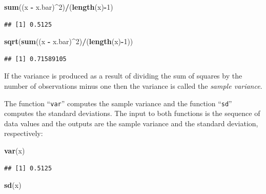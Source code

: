 \documentclass[]{krantz}
\makeatletter
\newenvironment{Shaded}{\begin{snugshade}}{\end{snugshade}}
\newcommand{\KeywordTok}[1]{\textcolor[rgb]{0.13,0.29,0.53}{\textbf{#1}}}
\newcommand{\DecValTok}[1]{\textcolor[rgb]{0.00,0.00,0.81}{#1}}
\newcommand{\StringTok}[1]{\textcolor[rgb]{0.31,0.60,0.02}{#1}}
\newcommand{\OperatorTok}[1]{\textcolor[rgb]{0.81,0.36,0.00}{\textbf{#1}}}
\newcommand{\NormalTok}[1]{#1}
\newenvironment{kframe}{%
\medskip{}
\setlength{\fboxsep}{.8em}
 \def\at@end@of@kframe{}%
 \ifinner\ifhmode%
  \def\at@end@of@kframe{\end{minipage}}%
  \begin{minipage}{\columnwidth}%
 \fi\fi%
 \def\FrameCommand##1{\hskip\@totalleftmargin \hskip-\fboxsep
 \colorbox{shadecolor}{##1}\hskip-\fboxsep
     \hskip-\linewidth \hskip-\@totalleftmargin \hskip\columnwidth}%
 \MakeFramed {\advance\hsize-\width
   \@totalleftmargin\z@ \linewidth\hsize
   \@setminipage}}%
 {\par\unskip\endMakeFramed%
 \at@end@of@kframe}
\renewenvironment{Shaded}{\begin{kframe}}{\end{kframe}}
\theoremstyle{definition}
\theoremstyle{definition}
\theoremstyle{definition}
\theoremstyle{remark}
\makeatother
\begin{document}
\begin{Shaded}
\begin{Highlighting}[]
\KeywordTok{sum}\NormalTok{((x }\OperatorTok{-}\StringTok{ }\NormalTok{x.bar)}\OperatorTok{^}\DecValTok{2}\NormalTok{)}\OperatorTok{/}\NormalTok{(}\KeywordTok{length}\NormalTok{(x)}\OperatorTok{-}\DecValTok{1}\NormalTok{)}
\end{Highlighting}
\end{Shaded}

\begin{verbatim}
## [1] 0.5125
\end{verbatim}

\begin{Shaded}
\begin{Highlighting}[]
\KeywordTok{sqrt}\NormalTok{(}\KeywordTok{sum}\NormalTok{((x }\OperatorTok{-}\StringTok{ }\NormalTok{x.bar)}\OperatorTok{^}\DecValTok{2}\NormalTok{)}\OperatorTok{/}\NormalTok{(}\KeywordTok{length}\NormalTok{(x)}\OperatorTok{-}\DecValTok{1}\NormalTok{))}
\end{Highlighting}
\end{Shaded}

\begin{verbatim}
## [1] 0.71589105
\end{verbatim}

If the variance is produced as a result of dividing the sum of squares
by the number of observations minus one then the variance is called the
\emph{sample variance}.

The function ``\texttt{var}'' computes the sample variance and the
function ``\texttt{sd}'' computes the standard deviations. The input to
both functions is the sequence of data values and the outputs are the
sample variance and the standard deviation, respectively:

\begin{Shaded}
\begin{Highlighting}[]
\KeywordTok{var}\NormalTok{(x)}
\end{Highlighting}
\end{Shaded}

\begin{verbatim}
## [1] 0.5125
\end{verbatim}

\begin{Shaded}
\begin{Highlighting}[]
\KeywordTok{sd}\NormalTok{(x)}
\end{Highlighting}
\end{Shaded}
\end{document}
